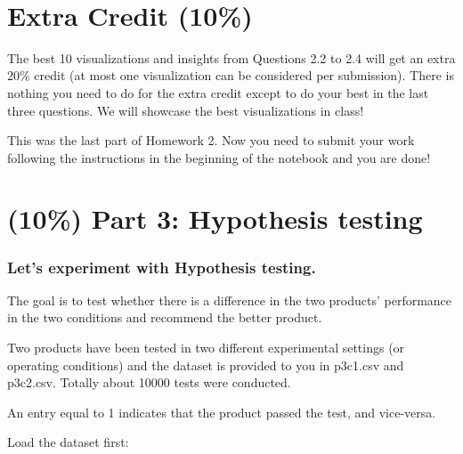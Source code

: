 \documentclass[11pt]{article}
\begin{document}
    \begin{center}
    \end{center}
    { \hspace*{\fill} \\}
    
    \section{Extra Credit (10\%)}\label{extra-credit-10}

The best 10 visualizations and insights from Questions 2.2 to 2.4 will
get an extra 20\% credit (at most one visualization can be considered
per submission). There is nothing you need to do for the extra credit
except to do your best in the last three questions. We will showcase the
best visualizations in class!

This was the last part of Homework 2. Now you need to submit your work
following the instructions in the beginning of the notebook and you are
done!

    \section{(10\%) Part 3: Hypothesis
testing}\label{part-3-hypothesis-testing}

    \subsubsection{Let's experiment with Hypothesis
testing.}\label{lets-experiment-with-hypothesis-testing.}

The goal is to test whether there is a difference in the two products'
performance in the two conditions and recommend the better product.

Two products have been tested in two different experimental settings (or
operating conditions) and the dataset is provided to you in p3c1.csv and
p3c2.csv. Totally about 10000 tests were conducted.

An entry equal to 1 indicates that the product passed the test, and
vice-versa.

Load the dataset first:
\end{document}
